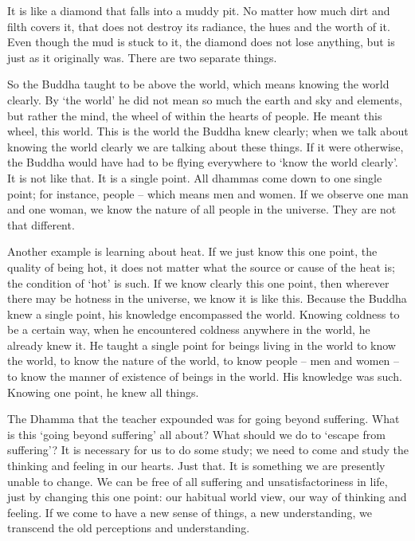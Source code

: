 It is like a diamond that falls into a muddy pit. No matter how much dirt and filth covers it, that does not destroy its radiance, the hues and the worth of it. Even though the mud is stuck to it, the diamond does not lose anything, but is just as it originally was. There are two separate things.

So the Buddha taught to be above the world, which means knowing the world clearly. By `the world' he did not mean so much the earth and sky and elements, but rather the mind, the wheel of  within the hearts of people. He meant this wheel, this world. This is the world the Buddha knew clearly; when we talk about knowing the world clearly we are talking about these things. If it were otherwise, the Buddha would have had to be flying everywhere to `know the world clearly'. It is not like that. It is a single point. All dhammas come down to one single point; for instance, people -- which means men and women. If we observe one man and one woman, we know the nature of all people in the universe. They are not that different.

Another example is learning about heat. If we just know this one point, the quality of being hot, it does not matter what the source or cause of the heat is; the condition of `hot' is such. If we know clearly this one point, then wherever there may be hotness in the universe, we know it is like this. Because the Buddha knew a single point, his knowledge encompassed the world. Knowing coldness to be a certain way, when he encountered coldness anywhere in the world, he already knew it. He taught a single point for beings living in the world to know the world, to know the nature of the world, to know people -- men and women -- to know the manner of existence of beings in the world. His knowledge was such. Knowing one point, he knew all things.

The Dhamma that the teacher expounded was for going beyond suffering. What is this `going beyond suffering' all about? What should we do to `escape from suffering'? It is necessary for us to do some study; we need to come and study the thinking and feeling in our hearts. Just that. It is something we are presently unable to change. We can be free of all suffering and unsatisfactoriness in life, just by changing this one point: our habitual world view, our way of thinking and feeling. If we come to have a new sense of things, a new understanding, we transcend the old perceptions and understanding.

